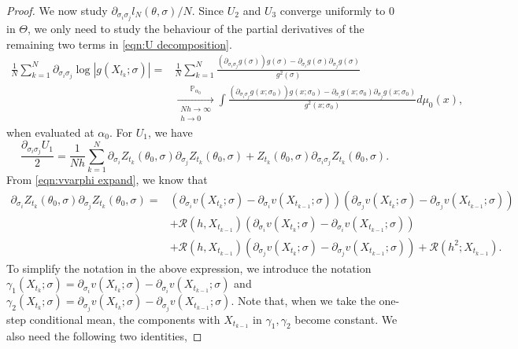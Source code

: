\documentclass[a4paper,12pt]{article}
\numberwithin{equation}{section}
\theoremstyle{plain}
\theoremstyle{definition}
\begin{document}
\begin{appendix}
\begin{proof}
    We now study $\partial_{\sigma_i\sigma_j}l_N(\theta,\sigma)/N$. Since $U_2$ and $U_3$ converge uniformly to $0$ in $\Theta$,   we only need to study the behaviour of the partial derivatives of the remaining two terms in \eqref{eqn:U decomposition}. 
    \begin{align}
        \frac{1}{N}\sum_{k=1}^N\partial_{\sigma_i\sigma_j}\log |g(X_{t_k};\sigma)|=&\frac{1}{N}\sum_{k=1}^N\frac{(\partial_{\sigma_i\sigma_j}g(\sigma))g(\sigma)-\partial_{\sigma_i}g(\sigma)\partial_{\sigma_j}g(\sigma)}{g^2(\sigma)}\nonumber\\
        &\xrightarrow[\substack{N h\rightarrow\infty \\ h \rightarrow 0}]{\mathbb{P}_{\alpha_0}}\int \frac{(\partial_{\sigma_i\sigma_j}g(x;\sigma_0))g(x;\sigma_0)-\partial_{\sigma_i}g(x;\sigma_0)\partial_{\sigma_j}g(x;\sigma_0)}{g^2(x;\sigma_0)}d\mu_0(x),\label{eqn:logg sigma sigma}
    \end{align}
    when evaluated at $\alpha_0$. For $U_1$, we have 
    \begin{equation*}
        \frac{\partial_{\sigma_i\sigma_j}U_1}{2}=\frac{1}{Nh}\sum_{k=1}^N\partial_{\sigma_i}Z_{t_{k}}(\theta_0,\sigma)\partial_{\sigma_j}Z_{t_{k}}(\theta_0,\sigma)+Z_{t_k}(\theta_0,\sigma)\partial_{\sigma_i\sigma_j}Z_{t_k}(\theta_0,\sigma).
    \end{equation*}
    From \eqref{eqn:vvarphi expand}, we know that 
    \begin{align*}
        \partial_{\sigma_i}Z_{t_k}(\theta_0,\sigma)\partial_{\sigma_j}Z_{t_k}(\theta_0,\sigma)=&\left(\partial_{\sigma_i}v(X_{t_k};\sigma)-\partial_{\sigma_i}v(X_{t_{k-1}};\sigma)\right)\left(\partial_{\sigma_j}v(X_{t_k};\sigma)-\partial_{\sigma_j}v(X_{t_{k-1}};\sigma)\right)\\
        &+\mathcal{R}(h,X_{t_{k-1}})\left(\partial_{\sigma_i}v(X_{t_k};\sigma)-\partial_{\sigma_i}v(X_{t_{k-1}};\sigma)\right)\\
        &+\mathcal{R}(h,X_{t_{k-1}})\left(\partial_{\sigma_j}v(X_{t_k};\sigma)-\partial_{\sigma_j}v(X_{t_{k-1}};\sigma)\right)+\mathcal{R}(h^2;X_{t_{k-1}}).
    \end{align*}
    To simplify the notation in the above expression, we introduce the notation $\gamma_1(X_{t_k};\sigma)=\partial_{\sigma_i}v(X_{t_k};\sigma)-\partial_{\sigma_i}v(X_{t_{k-1}};\sigma)$ and $\gamma_2(X_{t_k};
    \sigma)=\partial_{\sigma_j}v(X_{t_k};\sigma)-\partial_{\sigma_j}v(X_{t_{k-1}};\sigma)$. 
Note that, when we take the one-step conditional mean, the components with $X_{t_{k-1}}$ in $\gamma_1, \gamma_2$ become constant. We also need the following two identities,

\end{proof}
\end{appendix}
\end{document}
